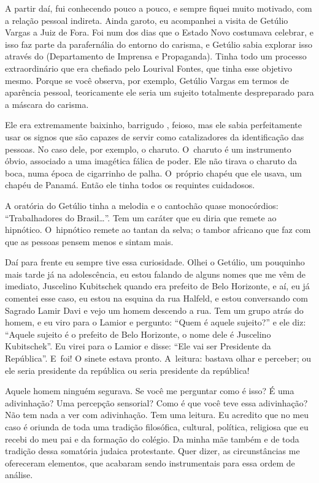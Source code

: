  

A partir daí, fui conhecendo pouco a pouco, e sempre fiquei muito
motivado, com a relação pessoal indireta. Ainda garoto, eu acompanhei a
visita de Getúlio Vargas a Juiz de Fora. Foi num dos dias que o Estado
Novo costumava celebrar, e isso faz parte da parafernália do entorno do
carisma, e Getúlio sabia explorar isso através do  (Departamento de
Imprensa e Propaganda). Tinha todo um processo extraordinário que era
chefiado pelo Lourival Fontes, que tinha esse objetivo mesmo. Porque se
você observa, por exemplo, Getúlio Vargas em termos de aparência
pessoal, teoricamente ele seria um sujeito totalmente despreparado
para a máscara do carisma.

 

Ele era extremamente baixinho, barrigudo , feioso, mas ele sabia
perfeitamente usar os signos que são capazes de servir como
catalizadores da identificação das pessoas. No caso dele, por exemplo, o
charuto. O~charuto é um instrumento óbvio, associado a uma imagética
fálica de poder. Ele não tirava o charuto da boca, numa época de
cigarrinho de palha. O~próprio chapéu que ele usava, um chapéu de
Panamá. Então ele tinha todos os requintes cuidadosos.

 

A oratória do Getúlio tinha a melodia e o cantochão quase monocórdios:
``Trabalhadores do Brasil…''. Tem um caráter que eu diria que
remete ao hipnótico. O~hipnótico remete ao tantan da selva; o tambor
africano que faz com que as pessoas pensem menos e sintam mais.

 

Daí para frente eu sempre tive essa curiosidade. Olhei o Getúlio, um
pouquinho mais tarde já na adolescência, eu estou falando de alguns
nomes que me vêm de imediato, Juscelino Kubitschek quando era prefeito
de Belo Horizonte, e aí, eu já comentei esse caso, eu estou na esquina
da rua Halfeld, e estou conversando com Sagrado Lamir Davi e vejo um
homem descendo a rua. Tem um grupo atrás do homem, e eu viro para o
Lamior e pergunto: ``Quem é aquele sujeito?'' e ele diz: ``Aquele sujeito
é o prefeito de Belo Horizonte, o nome dele é Juscelino Kubitschek''. Eu
virei para o Lamior e disse: ``Ele vai ser Presidente da República''. E~foi! O sinete estava pronto. A~leitura: bastava olhar e perceber; ou ele
seria presidente da república ou seria presidente da república!

 

Aquele homem ninguém segurava. Se você me perguntar como é isso? É uma
adivinhação? Uma percepção sensorial? Como é que você teve essa
adivinhação? Não tem nada a ver com adivinhação. Tem uma leitura. Eu
acredito que no meu caso é oriunda de toda uma tradição filosófica,
cultural, política, religiosa que eu recebi do meu pai e da formação do
colégio. Da minha mãe também e de toda tradição dessa somatória judaica
protestante. Quer dizer, as circunstâncias me ofereceram elementos, que
acabaram sendo instrumentais para essa ordem de análise.

